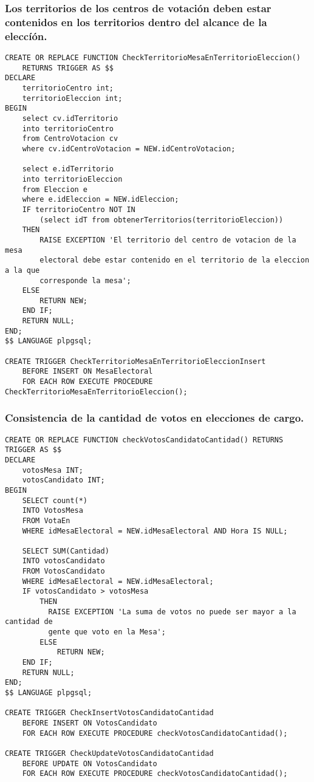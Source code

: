 \subsubsection{Los territorios de los centros de votación deben estar contenidos en los territorios dentro del alcance de la eleccíón.}

\begin{verbatim}
CREATE OR REPLACE FUNCTION CheckTerritorioMesaEnTerritorioEleccion() 
    RETURNS TRIGGER AS $$
DECLARE
    territorioCentro int;
    territorioEleccion int;
BEGIN
    select cv.idTerritorio 
    into territorioCentro 
    from CentroVotacion cv 
    where cv.idCentroVotacion = NEW.idCentroVotacion;
    
    select e.idTerritorio 
    into territorioEleccion 
    from Eleccion e 
    where e.idEleccion = NEW.idEleccion;
    IF territorioCentro NOT IN 
        (select idT from obtenerTerritorios(territorioEleccion))
    THEN
        RAISE EXCEPTION 'El territorio del centro de votacion de la mesa 
        electoral debe estar contenido en el territorio de la eleccion a la que 
        corresponde la mesa';
    ELSE
        RETURN NEW;
    END IF;
    RETURN NULL;
END;
$$ LANGUAGE plpgsql;

CREATE TRIGGER CheckTerritorioMesaEnTerritorioEleccionInsert
    BEFORE INSERT ON MesaElectoral
    FOR EACH ROW EXECUTE PROCEDURE CheckTerritorioMesaEnTerritorioEleccion();
\end{verbatim}

\subsubsection{Consistencia de la cantidad de votos en elecciones de cargo.}
\begin{verbatim}
CREATE OR REPLACE FUNCTION checkVotosCandidatoCantidad() RETURNS TRIGGER AS $$
DECLARE
    votosMesa INT;
    votosCandidato INT; 
BEGIN
    SELECT count(*) 
    INTO VotosMesa 
    FROM VotaEn 
    WHERE idMesaElectoral = NEW.idMesaElectoral AND Hora IS NULL;
    
    SELECT SUM(Cantidad) 
    INTO votosCandidato 
    FROM VotosCandidato 
    WHERE idMesaElectoral = NEW.idMesaElectoral;
    IF votosCandidato > votosMesa 
        THEN
          RAISE EXCEPTION 'La suma de votos no puede ser mayor a la cantidad de 
          gente que voto en la Mesa';
        ELSE
            RETURN NEW;
    END IF;
    RETURN NULL;
END;
$$ LANGUAGE plpgsql;

CREATE TRIGGER CheckInsertVotosCandidatoCantidad
    BEFORE INSERT ON VotosCandidato
    FOR EACH ROW EXECUTE PROCEDURE checkVotosCandidatoCantidad();

CREATE TRIGGER CheckUpdateVotosCandidatoCantidad
    BEFORE UPDATE ON VotosCandidato
    FOR EACH ROW EXECUTE PROCEDURE checkVotosCandidatoCantidad();

\end{verbatim}

